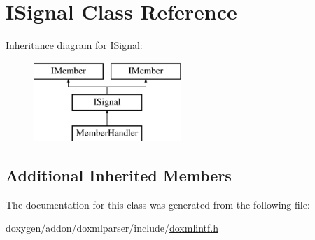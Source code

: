 \hypertarget{class_i_signal}{}\section{I\+Signal Class Reference}
\label{class_i_signal}
Inheritance diagram for I\+Signal\+:\begin{figure}[H]
\begin{center}
\leavevmode
\includegraphics[height=3.000000cm]{class_i_signal}
\end{center}
\end{figure}
\subsection*{Additional Inherited Members}


The documentation for this class was generated from the following file\+:\begin{DoxyCompactItemize}
\item 
doxygen/addon/doxmlparser/include/\mbox{\hyperlink{include_2doxmlintf_8h}{doxmlintf.\+h}}\end{DoxyCompactItemize}
